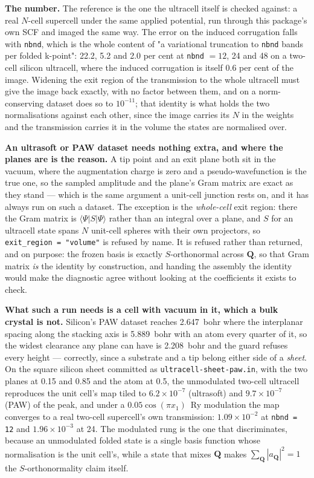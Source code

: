 \documentclass[11pt,a4paper]{article}
\newcommand{\code}[1]{\texttt{\small #1}}
\begin{document}
\textbf{The number.} The reference is the one the ultracell itself is checked
against: a real $N$-cell supercell under the same applied potential, run through
this package's own SCF and imaged the same way. The error on the induced
corrugation falls with \code{nbnd}, which is the whole content of "a variational
truncation to \code{nbnd} bands per folded k-point": 22.2, 5.2 and 2.0 per cent
at \code{nbnd} $= 12$, 24 and 48 on a two-cell silicon ultracell, where the
induced corrugation is itself 0.6 per cent of the image. Widening the exit
region of the transmission to the whole ultracell must give the image back
exactly, with no factor between them, and on a norm-conserving dataset does so
to $10^{-11}$; that identity is what holds the two normalisations against each
other, since the image carries its $N$ in the weights and the transmission
carries it in the volume the states are normalised over.

\textbf{An ultrasoft or PAW dataset needs nothing extra, and where the planes
are is the reason.} A tip point and an exit plane both sit in the vacuum, where
the augmentation charge is zero and a pseudo-wavefunction is the true one, so the
sampled amplitude and the plane's Gram matrix are exact as they stand --- which
is the same argument a unit-cell junction rests on, and it has always run on such
a dataset. The exception is the \emph{whole-cell} exit region: there the Gram
matrix is $\langle\Psi|S|\Psi\rangle$ rather than an integral over a plane, and
$S$ for an ultracell state spans $N$ unit-cell spheres with their own projectors,
so \code{exit\_region = "volume"} is refused by name. It is refused rather than
returned, and on purpose: the frozen basis is exactly $S$-orthonormal across
$\mathbf Q$, so that Gram matrix \emph{is} the identity by construction, and
handing the assembly the identity would make the diagnostic agree without looking
at the coefficients it exists to check.

\textbf{What such a run needs is a cell with vacuum in it, which a bulk crystal
is not.} Silicon's PAW dataset reaches 2.647~bohr where the interplanar spacing
along the stacking axis is 5.889~bohr with an atom every quarter of it, so the
widest clearance any plane can have is 2.208~bohr and the guard refuses every
height --- correctly, since a substrate and a tip belong either side of a
\emph{sheet}. On the square silicon sheet committed as
\code{ultracell-sheet-paw.in}, with the two planes at 0.15 and 0.85 and the atom
at 0.5, the unmodulated two-cell ultracell reproduces the unit cell's map tiled
to $6.2\times10^{-7}$ (ultrasoft) and $9.7\times10^{-7}$ (PAW) of the peak, and
under a $0.05\cos(\pi x_1)$~Ry modulation the map converges to a real two-cell
supercell's own transmission: $1.09\times10^{-2}$ at \code{nbnd = 12} and
$1.96\times10^{-3}$ at 24. The modulated rung is the one that discriminates,
because an unmodulated folded state is a single basis function whose
normalisation is the unit cell's, while a state that mixes $\mathbf Q$ makes
$\sum_{\mathbf Q}|a_{\mathbf Q}|^2 = 1$ the $S$-orthonormality claim itself.
\end{document}
